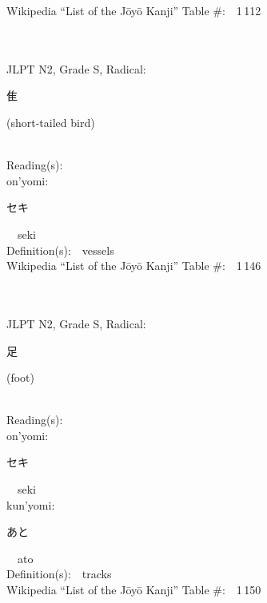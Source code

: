 \begin{multicols}{2}
Wikipedia ``List of the J\=oy\=o Kanji'' Table \#:\ \ 1\,112 \\
\ \ \\
{\fontsize{34pt}{40pt}  }\ \ \\  %
{JLPT N2, Grade S, Radical:\ \ {\begin{CJK}{UTF8}{min} 隹 \end{CJK}} (short-tailed bird) } \\
Reading(s):\ \ \\
{\hspace*{1em}}on'yomi:\ \ \\
{\hspace*{2em}}{\begin{CJK}{UTF8}{min} セキ \end{CJK}}\ \ seki\ \ \\
Definition(s):\ \ vessels \\
Wikipedia ``List of the J\=oy\=o Kanji'' Table \#:\ \ 1\,146 \\
\ \ \\
{\fontsize{34pt}{40pt}  }\ \ \\  %
{JLPT N2, Grade S, Radical:\ \ {\begin{CJK}{UTF8}{min} 足 \end{CJK}} (foot) } \\
Reading(s):\ \ \\
{\hspace*{1em}}on'yomi:\ \ \\
{\hspace*{2em}}{\begin{CJK}{UTF8}{min} セキ \end{CJK}}\ \ seki\ \ \\
{\hspace*{1em}}kun'yomi:\ \ \\
{\hspace*{2em}}{\begin{CJK}{UTF8}{min} あと \end{CJK}}\ \ ato\ \ \\
Definition(s):\ \ tracks \\
Wikipedia ``List of the J\=oy\=o Kanji'' Table \#:\ \ 1\,150 \\

\end{multicols}
